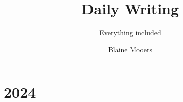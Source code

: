 
\title{Daily Writing}
\subtitle{Everything included}
\author{Blaine Mooers}
\makeatletter         
\def\@maketitle{
\begin{center}
{\Huge \bfseries \sffamily \@title }\\[4ex] 
{\Large \bfseries \sffamily \@subtitle }\\[4ex] 
{\Large  \@author}\\[4ex] 
\@date\\[8ex]
\vspace{1cm}
\end{center}}
\makeatother



\maketitle
\newpage
\frontmatter%

%

\tableofcontents
\listoffigures
\listoftables
\renewcommand\listoflistingscaption{List of source codes}
\listoflistings
\mainmatter%

\part{2024}
\setcounter{chapter}{0}













